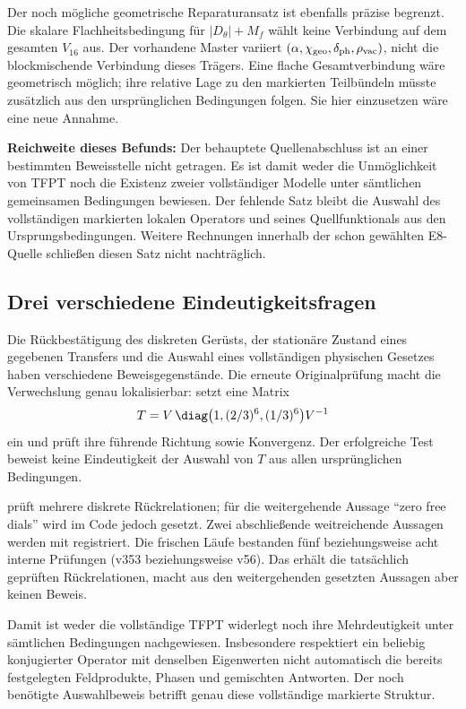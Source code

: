 Der noch mögliche geometrische Reparaturansatz ist ebenfalls präzise begrenzt. Die skalare Flachheitsbedingung für $|D_\theta|+M_f$ wählt keine Verbindung auf dem gesamten $V_{16}$ aus. Der vorhandene Master variiert $(\alpha,\chi_{\rm geo},\delta_{\rm ph},\rho_{\rm vac})$, nicht die blockmischende Verbindung dieses Trägers. Eine flache Gesamtverbindung wäre geometrisch möglich; ihre relative Lage zu den markierten Teilbündeln müsste zusätzlich aus den ursprünglichen Bedingungen folgen. Sie hier einzusetzen wäre eine neue Annahme.

\textbf{Reichweite dieses Befunds:} Der behauptete Quellenabschluss ist an einer bestimmten Beweisstelle nicht getragen. Es ist damit weder die Unmöglichkeit von TFPT noch die Existenz zweier vollständiger Modelle unter sämtlichen gemeinsamen Bedingungen bewiesen. Der fehlende Satz bleibt die Auswahl des vollständigen markierten lokalen Operators und seines Quellfunktionals aus den Ursprungsbedingungen. Weitere Rechnungen innerhalb der schon gewählten E8-Quelle schließen diesen Satz nicht nachträglich.

\subsection{Drei verschiedene Eindeutigkeitsfragen}
Die Rückbestätigung des diskreten Gerüsts, der stationäre Zustand eines gegebenen Transfers und die Auswahl eines vollständigen physischen Gesetzes haben verschiedene Beweisgegenstände. Die erneute Originalprüfung macht die Verwechslung genau lokalisierbar:  setzt eine Matrix
\[
T=V\,\diag\bigl(1,(2/3)^6,(1/3)^6\bigr)V^{-1}
\]
ein und prüft ihre führende Richtung sowie Konvergenz. Der erfolgreiche Test beweist keine Eindeutigkeit der Auswahl von $T$ aus allen ursprünglichen Bedingungen.

 prüft mehrere diskrete Rückrelationen; für die weitergehende Aussage ``zero free dials'' wird im Code jedoch  gesetzt. Zwei abschließende weitreichende Aussagen werden mit  registriert. Die frischen Läufe bestanden fünf beziehungsweise acht interne Prüfungen (v353 beziehungsweise v56). Das erhält die tatsächlich geprüften Rückrelationen, macht aus den weitergehenden gesetzten Aussagen aber keinen Beweis.

Damit ist weder die vollständige TFPT widerlegt noch ihre Mehrdeutigkeit unter sämtlichen Bedingungen nachgewiesen. Insbesondere respektiert ein beliebig konjugierter Operator mit denselben Eigenwerten nicht automatisch die bereits festgelegten Feldprodukte, Phasen und gemischten Antworten. Der noch benötigte Auswahlbeweis betrifft genau diese vollständige markierte Struktur.

